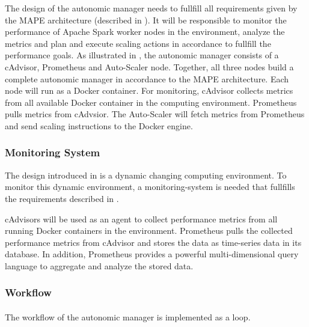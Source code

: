 The design of the autonomic manager needs to fullfill all requirements given by the MAPE architecture (described in ). It will be responsible to monitor the performance of Apache Spark worker nodes in the environment, analyze the metrics and plan and execute scaling actions in accordance to fullfill the performance goals.
As illustrated in , the autonomic manager consists of a cAdvisor, Prometheus and Auto-Scaler node. Together, all three nodes build a complete autonomic manager in accordance to the MAPE architecture. Each node will run as a Docker container.
For monitoring, cAdvisor collects metrics from all available Docker container in the computing environment. Prometheus pulls metrics from cAdvsior. The Auto-Scaler will fetch metrics from Prometheus and send scaling instructions to the Docker engine.


\subsubsection{Monitoring System}
The design introduced in  is a dynamic changing computing environment. To monitor this dynamic environment, a monitoring-system is needed that fullfills the requirements described in .


cAdvisors will be used as an agent to collect performance metrics from all running Docker containers in the environment.
Prometheus pulls the collected performance metrics from cAdvisor and stores the data as time-series data in its database.
In addition, Prometheus provides a powerful multi-dimensional query language to aggregate and analyze the stored data.



\subsubsection{Workflow}

\paragraph{} The workflow of the autonomic manager is implemented as a loop.

